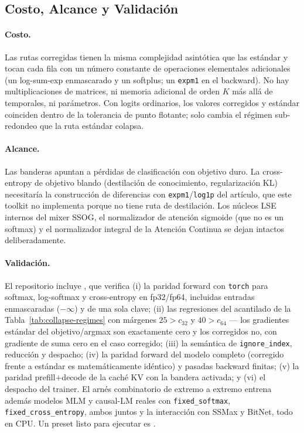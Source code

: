 \subsection{Costo, Alcance y Validación}
\label{sec:fixed-validation}

\paragraph{Costo.} Las rutas corregidas tienen la misma complejidad asintótica que las estándar y tocan cada fila con un número constante de operaciones elementales adicionales (un log-sum-exp enmascarado y un softplus; un \texttt{expm1} en el backward). No hay multiplicaciones de matrices, ni memoria adicional de orden $K$ más allá de temporales, ni parámetros. Con logits ordinarios, los valores corregidos y estándar coinciden dentro de la tolerancia de punto flotante; solo cambia el régimen sub-redondeo que la ruta estándar colapsa.

\paragraph{Alcance.} Las banderas apuntan a pérdidas de clasificación con objetivo duro. La cross-entropy de objetivo blando (destilación de conocimiento, regularización KL) necesitaría la construcción de diferencias con \texttt{expm1}/\texttt{log1p} del artículo, que este toolkit no implementa porque no tiene ruta de destilación. Los núcleos LSE internos del mixer SSOG, el normalizador de atención sigmoide (que no es un softmax) y el normalizador integral de la Atención Continua se dejan intactos deliberadamente.

\paragraph{Validación.} El repositorio incluye , que verifica (i) la paridad forward con \texttt{torch} para softmax, log-softmax y cross-entropy en fp32/fp64, incluidas entradas enmascaradas ($-\infty$) y de una sola clave; (ii) las regresiones del acantilado de la Tabla~\ref{tab:collapse-regimes} con márgenes $25 > c_{32}$ y $40 > c_{64}$ --- los gradientes estándar del objetivo/argmax son exactamente cero y los corregidos no, con gradiente de suma cero en el caso corregido; (iii) la semántica de \texttt{ignore\_index}, reducción y despacho; (iv) la paridad forward del modelo completo (corregido frente a estándar es matemáticamente idéntico) y pasadas backward finitas; (v) la paridad prefill$+$decode de la caché KV con la bandera activada; y (vi) el despacho del trainer. El arnés combinatorio de extremo a extremo entrena además modelos MLM y causal-LM reales con \texttt{fixed\_softmax}, \texttt{fixed\_cross\_entropy}, ambos juntos y la interacción con SSMax y BitNet, todo en CPU. Un preset listo para ejecutar es .

